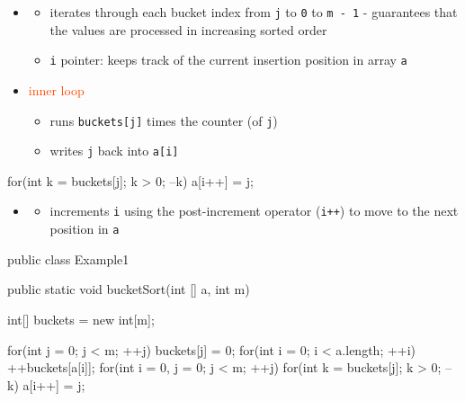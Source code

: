 \begin{mybox}[OrangeRed]{}
    \vspace{0.25cm}

    \begin{itemize}
        \item[]{}
        \begin{itemize}
            \item iterates through each bucket index from \texttt{j} to \texttt{0} to \texttt{m - 1} - guarantees that the values are processed in increasing sorted order
            \item \texttt{i} pointer: keeps track of the current insertion position in array \texttt{a}
        \end{itemize}
    \end{itemize} 
    
    \noindent
    \begin{minipage}{0.5\textwidth}
        \begin{itemize}
            \item[] \textcolor{OrangeRed}{inner loop}
                \begin{itemize}
                    \item runs \texttt{buckets[j]} times the counter (of \texttt{j})
                    \item writes \texttt{j} back into \texttt{a[i]}
                \end{itemize}
        \end{itemize}
    \end{minipage}
    \begin{minipage}{0.5\textwidth}
        \begin{tightcode}
for(int k = buckets[j]; k > 0; --k) {
    a[i++] = j;
}
        \end{tightcode}
    \end{minipage}

    \begin{itemize}
    \item[]{}
        \begin{itemize}
            \item increments \texttt{i} using the post-increment operator (\texttt{i++}) to move to the next position in \texttt{a}
        \end{itemize}
\end{itemize}
\end{mybox}

\begin{center}
    \begin{tightcode}
public class Example1 {
    public static void bucketSort(int [] a, int m) {
        int[] buckets = new int[m];

        for(int j = 0; j < m; ++j) {
            buckets[j] = 0;
        }
        for(int i = 0; i < a.length; ++i) {
            ++buckets[a[i]];
        }
        for(int i = 0, j = 0; j < m; ++j) {
            for(int k = buckets[j]; k > 0; --k) {
                a[i++] = j;
            }
        }
    }
}
    \end{tightcode}
\end{center}

